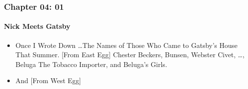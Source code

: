\begin{frame}
\frametitle{Chapter 04: 01}
\framesubtitle{Nick Meets Gatsby}
\label{slide:chapter-04-01}
\begin{itemize}
\item Once I Wrote Down \dots The Names of Those Who Came to Gatsby's House That Summer. [From East Egg] Chester Beckers, Bunsen, Webster Civet, \dots, Beluga The Tobacco Importer, and Beluga's Girls.
\item And [From West Egg]
\end{itemize}
\end{frame}
